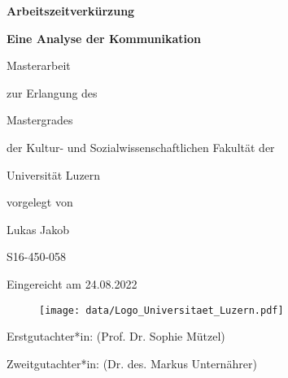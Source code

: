 \begin{titlepage}

\begin{center}

\Huge \textbf{Arbeitszeitverkürzung}

\Large \textbf{Eine Analyse der Kommunikation}

\large Masterarbeit

\large zur Erlangung des

\large Mastergrades

\large der Kultur- und Sozialwissenschaftlichen Fakultät der

\large Universität Luzern



\large vorgelegt von



\large Lukas Jakob

\large S16-450-058

\large Eingereicht am 24.08.2022


\end{center}

\begin{figure}[!htbp]
		\begin{center}
			\texttt{[image: data/Logo\_Universitaet\_Luzern.pdf]}
		\end{center}
\end{figure}

\begin{flushleft}
\small Erstgutachter*in: (Prof. Dr. Sophie Mützel)

\small Zweitgutachter*in: (Dr. des. Markus Unternährer)
\end{flushleft}
\end{titlepage}